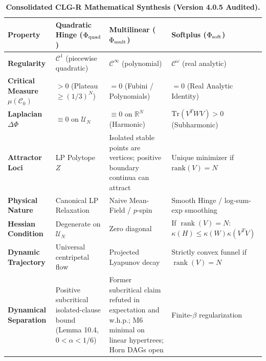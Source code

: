 \documentclass[11pt,a4paper]{article}
\begin{document}
\begin{table}[htbp]
\centering
\footnotesize
\caption{\textbf{Consolidated CLG-R Mathematical Synthesis (Version 4.0.5 Audited).}}
\begin{tabularx}{\textwidth}{@{}p{}XXX@{}}
\toprule
\textbf{Property} & \textbf{Quadratic Hinge ($\Phi_{\rm quad}$)} & \textbf{Multilinear ($\Phi_{\rm mult}$)} & \textbf{Softplus ($\Phi_{\rm soft}$)} \\
\midrule
\textbf{Regularity} & $\mathcal{C}^1$ (piecewise quadratic) & $\mathcal{C}^\infty$ (polynomial) & $\mathcal{C}^\omega$ (real analytic) \\
\textbf{Critical Measure $\mu(\mathcal{C}_0)$} & $> 0$ (Plateau $\geq (1/3)^N$) & $= 0$ (Fubini / Polynomials) & $= 0$ (Real Analytic Identity) \\
\textbf{Laplacian $\Delta\Phi$} & $\equiv 0$ on $\mathcal{U}_N$ & $\equiv 0$ on $\mathbb{R}^N$ (Harmonic) & $\text{Tr}(V^T W V) > 0$ (Subharmonic) \\
\textbf{Attractor Loci} & LP Polytope $Z$ & Isolated stable points are vertices; positive boundary continua can attract & Unique minimizer if $\text{rank}(V)=N$ \\
\textbf{Physical Nature} & Canonical LP Relaxation & Naive Mean-Field / $p$-spin & Smooth Hinge / log-sum-exp smoothing \\
\textbf{Hessian Condition} & Degenerate on $\mathcal{U}_N$ & Zero diagonal & If $\operatorname{rank}(V)=N$: $\kappa(H) \le \kappa(W) \kappa(V^T V)$ \\
\textbf{Dynamic Trajectory} & Universal centripetal flow & Projected Lyapunov decay & Strictly convex funnel if $\operatorname{rank}(V)=N$ \\
\textbf{Dynamical Separation} & Positive subcritical isolated-clause bound (Lemma 10.4, $0<\alpha<1/6$) & Former subcritical claim refuted in expectation and w.h.p.; M6 minimal on linear hypertrees; Horn DAGs open & Finite-$\beta$ regularization \\
\bottomrule
\end{tabularx}
\label{tab:synthesis}
\end{table}
\end{document}
